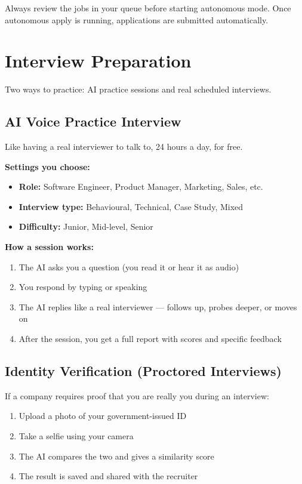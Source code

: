 \documentclass[12pt, a4paper]{report}
\begin{document}
\begin{warningbox}
Always review the jobs in your queue before starting autonomous mode.  Once
autonomous apply is running, applications are submitted automatically.
\end{warningbox}

\section{Interview Preparation}

Two ways to practice: AI practice sessions and real scheduled interviews.

\subsection{AI Voice Practice Interview}

Like having a real interviewer to talk to, 24 hours a day, for free.

\textbf{Settings you choose:}
\begin{itemize}
  \item \textbf{Role:} Software Engineer, Product Manager, Marketing, Sales, etc.
  \item \textbf{Interview type:} Behavioural, Technical, Case Study, Mixed
  \item \textbf{Difficulty:} Junior, Mid-level, Senior
\end{itemize}

\textbf{How a session works:}
\begin{enumerate}
  \item The AI asks you a question (you read it or hear it as audio)
  \item You respond by typing or speaking
  \item The AI replies like a real interviewer --- follows up, probes deeper, or moves on
  \item After the session, you get a full report with scores and specific feedback
\end{enumerate}

\subsection{Identity Verification (Proctored Interviews)}

If a company requires proof that you are really you during an interview:
\begin{enumerate}
  \item Upload a photo of your government-issued ID
  \item Take a selfie using your camera
  \item The AI compares the two and gives a similarity score
  \item The result is saved and shared with the recruiter
\end{enumerate}
\end{document}
